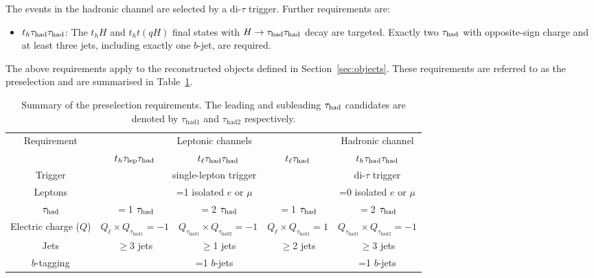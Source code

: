 The events in the hadronic channel are selected by a di-$\tau$ trigger. Further requirements are:
\begin{itemize}
\item $t_h\tau_{\mathrm{had}} \tau_{\mathrm{had}}$: The $t_hH$ and $t_ht(qH)$ final states with $H\to\tau_{\mathrm{had}} \tau_{\mathrm{had}}$ decay are targeted. Exactly two $\tau_{\mathrm{had}}$ with opposite-sign charge and at least three jets, including exactly one $b$-jet, are required.
\end{itemize}

The above requirements apply to the reconstructed objects defined in Section~\ref{sec:objects}.
These requirements are referred to as the preselection and are summarised in Table~\ref{tab:preselection}. 

\begin{table*}[t!]
\caption{\small{Summary of the preselection requirements. 
The leading and subleading $\tau_{\mathrm{had}}$ candidates are denoted by $\tau_{\mathrm{had1}}$ and $\tau_{\mathrm{had2}}$ respectively.}}
\begin{center}
\begin{tabular}{c|ccc|c}
\toprule\toprule
\multirow{2}{*}{Requirement} &  \multicolumn{3}{c|}{Leptonic channels}  & \multicolumn{1}{c}{Hadronic channel} \\ 
& $t_h\tau_{\mathrm{lep}} \tau_{\mathrm{had}}$ & $t_{\ell}\tau_{\mathrm{had}} \tau_{\mathrm{had}}$ &  $t_{\ell}\tau_{\mathrm{had}}$ & $t_h\tau_{\mathrm{had}} \tau_{\mathrm{had}}$\\
\midrule
Trigger & \multicolumn{3}{c|}{single-lepton trigger} & di-$\tau$ trigger  \\
Leptons  & \multicolumn{3}{c|}{=1 isolated $e$ or $\mu$}  & =0 isolated $e$ or $\mu$ \\
$\tau_{\mathrm{had}}$  & $=$1 $\tau_{\mathrm{had}}$ & $=$2 $\tau_{\mathrm{had}}$ & $=$1 $\tau_{\mathrm{had}}$ & $=$2 $\tau_{\mathrm{had}}$ \\
Electric charge ($Q$) & $Q_\ell \times Q_{\tau_{\mathrm{had1}}} = -1$ & $Q_{\tau_{\mathrm{had1}}} \times Q_{\tau_{\mathrm{had2}}} = -1$ & $Q_\ell \times Q_{\tau_{\mathrm{had1}}} = 1$ & $Q_{\tau_{\mathrm{had1}}} \times Q_{\tau_{\mathrm{had2}}} = -1$ \\
Jets  &   $\geq$3 jets & $\geq$1 jets & $\geq$2 jets & $\geq$3 jets \\
$b$-tagging & \multicolumn{3}{c|}{=1 $b$-jets} & =1 $b$-jets\\
\bottomrule\bottomrule
\end{tabular}
\label{tab:preselection}
\end{center}
\end{table*}
